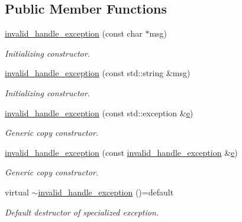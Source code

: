 \subsection*{Public Member Functions}
\begin{DoxyCompactItemize}
\item 
\hyperlink{class_d_d4hep_1_1invalid__handle__exception_a89d95e32d6ca7f17d77b4f44fa7ecc7a}{invalid\+\_\+handle\+\_\+exception} (const char $\ast$msg)
\begin{DoxyCompactList}\small\item\em Initializing constructor. \end{DoxyCompactList}\item 
\hyperlink{class_d_d4hep_1_1invalid__handle__exception_a6ed4463753276b8dc70197302a5ca085}{invalid\+\_\+handle\+\_\+exception} (const std\+::string \&msg)
\begin{DoxyCompactList}\small\item\em Initializing constructor. \end{DoxyCompactList}\item 
\hyperlink{class_d_d4hep_1_1invalid__handle__exception_a9f983790d122d9b8b81c1147a99a3e01}{invalid\+\_\+handle\+\_\+exception} (const std\+::exception \&\hyperlink{_volumes_8cpp_a8a9a1f93e9b09afccaec215310e64142}{e})
\begin{DoxyCompactList}\small\item\em Generic copy constructor. \end{DoxyCompactList}\item 
\hyperlink{class_d_d4hep_1_1invalid__handle__exception_a4216bbb641a3d4bb30d71f24a835da51}{invalid\+\_\+handle\+\_\+exception} (const \hyperlink{class_d_d4hep_1_1invalid__handle__exception}{invalid\+\_\+handle\+\_\+exception} \&\hyperlink{_volumes_8cpp_a8a9a1f93e9b09afccaec215310e64142}{e})
\begin{DoxyCompactList}\small\item\em Generic copy constructor. \end{DoxyCompactList}\item 
virtual \hyperlink{class_d_d4hep_1_1invalid__handle__exception_a7a035ad25b257272d737dfaa3ded4087}{$\sim$invalid\+\_\+handle\+\_\+exception} ()=default
\begin{DoxyCompactList}\small\item\em Default destructor of specialized exception. \end{DoxyCompactList}\end{DoxyCompactItemize}


